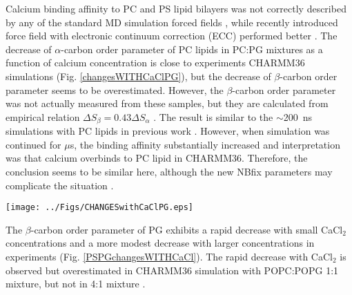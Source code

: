 \documentclass[aps,prl,superscriptaddress,twocolumn]{revtex4}
\begin{document}
Calcium binding affinity to PC and PS lipid bilayers was not correctly described by
any of the standard MD simulation forced fields \cite{catte16,NMRlipidsIVps}, while
recently introduced force field with electronic continuum correction (ECC) performed better \cite{melcr18}.
The decrease of $\alpha$-carbon order parameter of PC lipids in PC:PG mixtures as a function
of calcium concentration is close to experiments CHARMM36 simulations (Fig. \ref{changesWITHCaClPG}),
but the decrease of $\beta$-carbon order parameter seems to be overestimated.
However, the $\beta$-carbon order parameter was not actually measured from these samples,
but they are calculated from empirical relation $\Delta S_{\beta}=0.43\Delta S_{\alpha}$ \cite{akutsu81}.
The result is similar to the $\sim$200~ns simulations with PC lipids in previous work \cite{catte16}.
However, when simulation was continued for $\mu$s, the binding affinity substantially increased
and interpretation was that calcium overbinds to PC lipid in CHARMM36. Therefore, the
conclusion seems to be similar here, although the new NBfix parameters may complicate
the situation .
\begin{figure*}[]
  \centering
  \texttt{[image: ../Figs/CHANGESwithCaClPG.eps]}
  \caption{\label{changesWITHCaClPG}
    (left) The headgroup order parameters of PC from PC:PG mixtures as a function CaCl$_2$
    concentration from experiments \cite{borle85,macdonald87} and CHARMM36 simulations.
    Note that beta order parameter is calculated from empirical relation $\Delta S_{\beta}=0.43\Delta S_{\alpha}$ \cite{akutsu81}, not actually measured.
    (right) The headgroup order parameters of PG from PC:PG mixtures as a function CaCl$_2$
    concentration from experiments \cite{borle85} and CHARMM36 simulations.
  }
\end{figure*}

The $\beta$-carbon order parameter of PG exhibits a rapid decrease with small CaCl$_2$ concentrations
and a more modest decrease with larger concentrations in experiments \cite{borle85} (Fig. \ref{PSPGchangesWITHCaCl}).
The rapid decrease with CaCl$_2$ is observed but overestimated in CHARMM36 simulation
with POPC:POPG 1:1 mixture, but not in 4:1 mixture .
\end{document}
